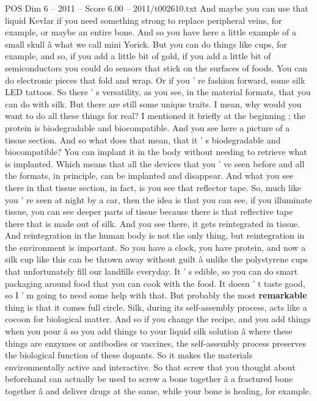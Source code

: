 \begin{textsample}{POS Dim 6 – 2011 – Score 6.00 – 2011/t002610.txt}
And maybe you can use that liquid Kevlar if you need something strong to replace peripheral veins, for example, or maybe an entire bone.
And so you have here a little example of a small skull â what we call mini Yorick.
But you can do things like cups, for example, and so, if you add a little bit of gold, if you add a little bit of semiconductors you could do sensors that stick on the surfaces of foods.
You can do electronic pieces that fold and wrap.
Or if you ' re fashion forward, some silk LED tattoos.
So there ' s versatility, as you see, in the material formats, that you can do with silk.
But there are still some unique traits.
I mean, why would you want to do all these things for real?
I mentioned it briefly at the beginning ; the protein is biodegradable and biocompatible.
And you see here a picture of a tissue section.
And so what does that mean, that it ' s biodegradable and biocompatible?
You can implant it in the body without needing to retrieve what is implanted.
Which means that all the devices that you ' ve seen before and all the formats, in principle, can be implanted and disappear.
And what you see there in that tissue section, in fact, is you see that reflector tape.
So, much like you ' re seen at night by a car, then the idea is that you can see, if you illuminate tissue, you can see deeper parts of tissue because there is that reflective tape there that is made out of silk.
And you see there, it gets reintegrated in tissue.
And reintegration in the human body is not the only thing, but reintegration in the environment is important.
So you have a clock, you have protein, and now a silk cup like this can be thrown away without guilt â unlike the polystyrene cups that unfortunately fill our landfills everyday.
It ' s edible, so you can do smart packaging around food that you can cook with the food.
It doesn ' t taste good, so I ' m going to need some help with that.
But probably the most \textbf{remarkable} thing is that it comes full circle.
Silk, during its self-assembly process, acts like a cocoon for biological matter.
And so if you change the recipe, and you add things when you pour â so you add things to your liquid silk solution â where these things are enzymes or antibodies or vaccines, the self-assembly process preserves the biological function of these dopants.
So it makes the materials environmentally active and interactive.
So that screw that you thought about beforehand can actually be used to screw a bone together â a fractured bone together â and deliver drugs at the same, while your bone is healing, for example.

\end{textsample}
